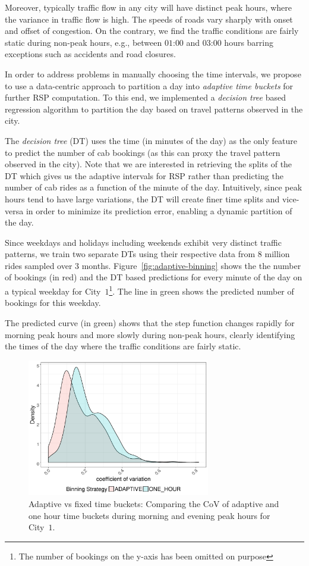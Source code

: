 \documentclass[conference]{IEEEtran}
\begin{document}
Moreover, typically traffic flow in any city will have distinct peak hours, where the variance in traffic flow is high. The speeds of roads vary sharply with onset and offset of congestion. On the contrary, we  find the traffic conditions are fairly static during non-peak hours, e.g., between $01$:$00$ and $03$:$00$ hours barring exceptions such as accidents and road closures. 


In order to address problems in manually choosing the time intervals, we propose to use a data-centric approach to partition a day into \emph{adaptive time buckets} for further \ac{RSP} computation. 
To this end, we implemented a \emph{decision tree} based regression algorithm to partition the day based on travel patterns observed in the city.

 
The \emph{decision tree} (DT) uses the time (in minutes of the day) as the only feature to predict the number of cab bookings (as this can proxy the travel pattern observed in the city). Note that we are interested in retrieving the splits of the DT which gives us the adaptive intervals for \ac{RSP} rather than predicting the number of cab rides as a function of the minute of the day. Intuitively, since peak hours tend to have large variations, the DT will create finer time splits and vice-versa in order to minimize its prediction error, enabling a dynamic partition of the day. 

Since weekdays and holidays including weekends exhibit very distinct traffic patterns, we train two separate DTs using their respective data from $8$ million rides sampled over 3 months.  Figure~\ref{fig:adaptive-binning} shows the the number of bookings (in red) and the DT based predictions for every minute of the day on a typical weekday for City~$1$\footnote{The number of bookings on the y-axis has been omitted on purpose}. The line in green shows the predicted number of bookings for this weekday. 

The predicted curve (in green) shows that the step function changes rapidly for  morning peak hours and more slowly during non-peak hours, clearly identifying the times of the day where the traffic conditions are fairly static. 


\begin{figure}[!tb]
	\centering
	\includegraphics[width=\columnwidth,center,height=6cm,keepaspectratio]{images/COV.pdf}
	
	\caption{Adaptive vs fixed time buckets: Comparing the \ac{CoV} of adaptive and one hour time buckets during morning and evening peak hours for City~$1$.}
	\label{fig:compare-binning}
\end{figure}
\end{document}
